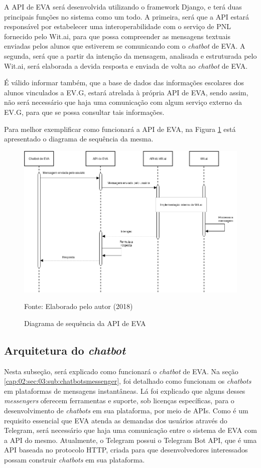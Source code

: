 A API de EVA será desenvolvida utilizando o framework Django, e terá duas principais funções no sistema como um todo. A primeira, será que a API estará responsável por estabelecer uma interoperabilidade com o serviço de PNL fornecido pelo Wit.ai, para que possa compreender as mensagens textuais enviadas pelos alunos que estiverem se comunicando com o \textit{chatbot} de EVA. A segunda, será que a partir da intenção da mensagem, analisada e estruturada pelo Wit.ai, será elaborada a devida resposta e enviada de volta ao \textit{chatbot} de EVA.

É válido informar também, que a base de dados das informações escolares dos alunos vinculados a EV.G, estará atrelada à própria API de EVA, sendo assim, não será necessário que haja uma comunicação com algum serviço externo da EV.G, para que se possa consultar tais informações.

Para melhor exemplificar como funcionará a API de EVA, na Figura \ref{cap:03:fig:diagrama-sequencia-1} está apresentado o diagrama de sequência da mesma.
\begin{figure}[htb!]
    \centering
    \includegraphics[width=0.7\linewidth]{src/imagens/EVAAPISEQUENCE.png}
    \caption{Diagrama de sequência da API de EVA} Fonte: Elaborado pelo autor (2018)
    \label{cap:03:fig:diagrama-sequencia-1}
\end{figure}

\subsection{Arquitetura do \textit{chatbot}}

Nesta subseção, será explicado como funcionará o \textit{chatbot} de EVA. Na seção \ref{cap:02:sec:03:sub:chatbotsmessenger}, foi detalhado como funcionam os \textit{chatbots} em plataformas de mensagens instantâneas. Lá foi explicado que alguns desses \textit{messengers} oferecem ferramentas e suporte, sob licenças específicas, para o desenvolvimento de \textit{chatbots} em sua plataforma, por meio de APIs. Como é um requisito essencial que EVA atenda as demandas dos usuários através do Telegram, será necessário que haja uma comunicação entre o sistema de EVA com a API do mesmo. Atualmente, o Telegram possui o Telegram Bot API, que é uma API baseada no protocolo HTTP, criada para que desenvolvedores interessados possam construir \textit{chatbots} em sua plataforma.

